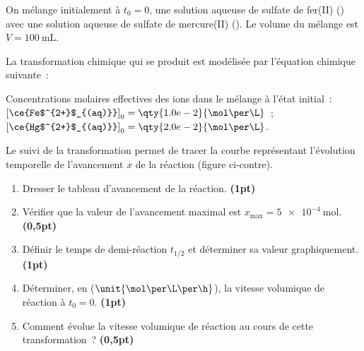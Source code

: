On mélange initialement à $t_{0}=0$, une solution aqueuse de sulfate de fer(II)
() avec une solution aqueuse de
sulfate de mercure(II) ().  Le volume
du mélange est $V=\qty{100}{\mL}$.

La transformation chimique qui se produit est modélisée par l'équation chimique
suivante~:
\begin{center}
\end{center}

\begin{donnees}
    Concentrations molaires effectives des ions dans le mélange à l'état
    initial~: \\
    $\left[\ce{Fe$^{2+}$_{(aq)}}\right]_{0}=\qty{1.0e-2}{\mol\per\L}$~;
    $\left[\ce{Hg$^{2+}$_{(aq)}}\right]_{0}=\qty{2.0e-2}{\mol\per\L}$.
\end{donnees}
\begin{minipage}{0.52\linewidth}
    Le suivi de la transformation permet de tracer la courbe représentant
    l'évolution temporelle de l'avancement $x$ de la réaction (figure
    ci-contre).

    \begin{enumerate}
        \item Dresser le tableau d'avancement de la réaction.
              \textbf{(1pt)}
        \item Vérifier que la valeur de l'avancement maximal est
              $x_{\max}=\qty{5e-4}{\mol}$.
              \textbf{(0,5pt)}
        \item Définir le temps de demi-réaction $t_{1/2}$ et déterminer sa valeur
              graphiquement.
              \textbf{(1pt)}
        \item Déterminer, en ($\unit{\mol\per\L\per\h}$), la vitesse volumique de
              réaction à $t_{0}=0$.
              \textbf{(1pt)}
        \item Comment évolue la vitesse volumique de réaction au cours de cette
              transformation~?
              \textbf{(0,5pt)}
    \end{enumerate}
\end{minipage}
\hfill
\begin{minipage}{0.44\linewidth}
\end{minipage}



